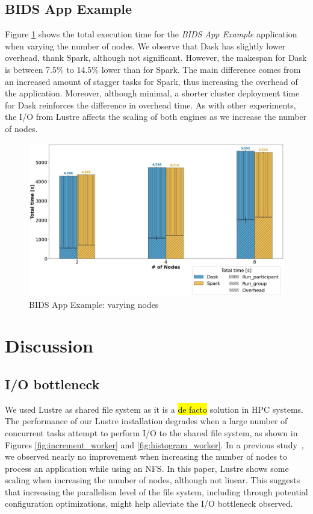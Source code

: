 \documentclass[AMA,STIX1COL]{WileyNJD-v2}
\newcommand{\HL}[1]{\hl{#1}}
\begin{document}
\subsection{BIDS App Example}
Figure \ref{fig:bids} shows the total execution time for the \textit{BIDS App Example} application when varying the number of nodes.
We observe that Dask has slightly lower overhead, thank Spark, although not significant.
However, the makespan for Dask is between 7.5\% to 14.5\% lower than for Spark.
The main difference comes from an increased amount of stagger tasks for Spark, thus increasing the overhead of the application.
Moreover, although minimal, a shorter cluster deployment time for Dask reinforces the difference in overhead time.
As with other experiments, the I/O from Lustre affects the scaling of both engines as we increase the number of nodes.
\begin{figure}[!h]
	\centering
	\includegraphics[clip,width=0.75\columnwidth]{figures/stacked_bids.jpg}
	\caption{BIDS App Example: varying nodes}
	\label{fig:bids}
\end{figure}
		
\section{Discussion}
\subsection{I/O bottleneck}
We used Lustre as shared file system as it is a \HL{de facto} solution in HPC systems.
The performance of our Lustre installation degrades when a large number of concurrent tasks attempt to perform I/O to the shared file system, as shown in Figures \ref{fig:increment_worker} and \ref{fig:histogram_worker}.
In a previous study~\cite{8943502}, we observed nearly no improvement when increasing the number of nodes to process an application while using an NFS.
In this paper, Lustre shows some scaling when increasing the number of nodes, although not linear.
This suggests that increasing the parallelism level of the file system, including through potential configuration optimizations, might help alleviate the I/O bottleneck observed.
		
\end{document}

